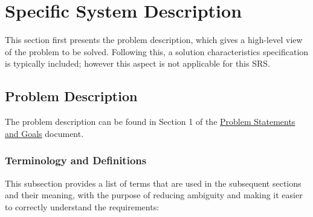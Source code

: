 \documentclass[12pt]{article}
\begin{document}
\newpage

\section{Specific System Description}

This section first presents the problem description, which gives a high-level
view of the problem to be solved. Following this, a solution characteristics
specification is typically included; however this aspect is not applicable for
this SRS.


\subsection{Problem Description}\label{Sec_pd}

The problem description can be found in Section 1 of the
\href{https://github.com/PlutosCapstone/Plutos/blob/main/docs/ProblemStatementAndGoals/ProblemStatement.pdf}{Problem
Statements and Goals} document.

\subsubsection{Terminology and  Definitions}

This subsection provides a list of terms that are used in the subsequent
sections and their meaning, with the purpose of reducing ambiguity and making it
easier to correctly understand the requirements:
\end{document}
